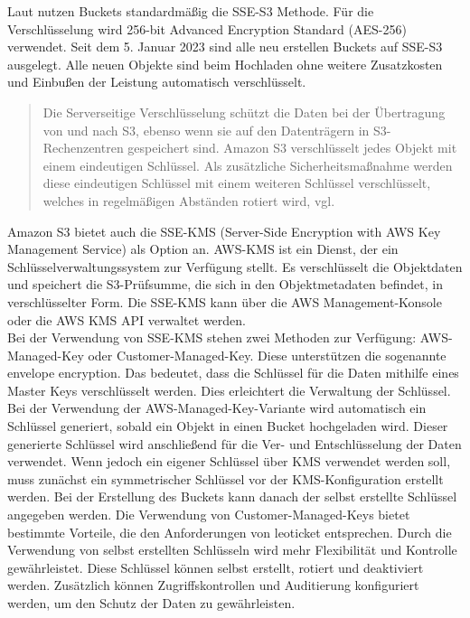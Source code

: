 Laut \citeauthor{aws-iam-s3} nutzen Buckets standardmäßig die SSE-S3 Methode. Für die Verschlüsselung wird 256-bit Advanced Encryption Standard (AES-256) verwendet. Seit dem 5. Januar 2023 sind alle neu erstellen Buckets auf SSE-S3 ausgelegt. Alle neuen Objekte sind beim Hochladen ohne weitere Zusatzkosten und Einbußen der Leistung automatisch verschlüsselt.

\begin{quote}
	Die Serverseitige Verschlüsselung schützt die Daten bei der Übertragung von und nach S3, ebenso wenn sie auf den Datenträgern in S3-Rechenzentren gespeichert sind. Amazon S3 verschlüsselt jedes Objekt mit einem eindeutigen Schlüssel. Als zusätzliche Sicherheitsmaßnahme werden diese eindeutigen Schlüssel mit einem weiteren Schlüssel verschlüsselt, welches in regelmäßigen Abständen rotiert wird, vgl. \cite{aws-iam-s3}
\end{quote}

\newpage

Amazon S3 bietet auch die SSE-KMS (Server-Side Encryption with AWS Key Management Service) als Option an. AWS-KMS ist ein Dienst, der ein Schlüsselverwaltungssystem zur Verfügung stellt. Es verschlüsselt die Objektdaten und speichert die S3-Prüfsumme, die sich in den Objektmetadaten befindet, in verschlüsselter Form. Die SSE-KMS kann über die AWS Management-Konsole oder die AWS KMS API verwaltet werden.\\

Bei der Verwendung von SSE-KMS stehen zwei Methoden zur Verfügung: AWS-Managed-Key oder Customer-Managed-Key. Diese unterstützen die sogenannte \glqq envelope encryption\grqq. Das bedeutet, dass die Schlüssel für die Daten mithilfe eines Master Keys verschlüsselt werden. Dies erleichtert die Verwaltung der Schlüssel.\\

Bei der Verwendung der AWS-Managed-Key-Variante wird automatisch ein Schlüssel generiert, sobald ein Objekt in einen Bucket hochgeladen wird. Dieser generierte Schlüssel wird anschließend für die Ver- und Entschlüsselung der Daten verwendet. Wenn jedoch ein eigener Schlüssel über KMS verwendet werden soll, muss zunächst ein symmetrischer Schlüssel vor der KMS-Konfiguration erstellt werden. Bei der Erstellung des Buckets kann danach der selbst erstellte Schlüssel angegeben werden. Die Verwendung von Customer-Managed-Keys bietet bestimmte Vorteile, die den Anforderungen von leoticket entsprechen. Durch die Verwendung von selbst erstellten Schlüsseln wird mehr Flexibilität und Kontrolle gewährleistet. Diese Schlüssel können selbst erstellt, rotiert und deaktiviert werden. Zusätzlich können Zugriffskontrollen und Auditierung konfiguriert werden, um den Schutz der Daten zu gewährleisten.\\

